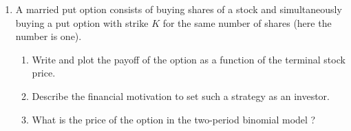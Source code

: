 \documentclass[11pt,a4,table]{article}
\begin{document}
\begin{enumerate}
    \item A married put option consists of buying shares of a stock and simultaneously buying a put option with strike $K$ for the same number of shares (here the number is one). 
    \begin{enumerate}
        \item Write and plot the payoff of the option as a function of the terminal stock price.
        \item Describe the financial motivation to set such a strategy as an investor.
        \item What is the price of the option in the two-period binomial model ?
    \end{enumerate}
    
\end{enumerate}
\end{document}
